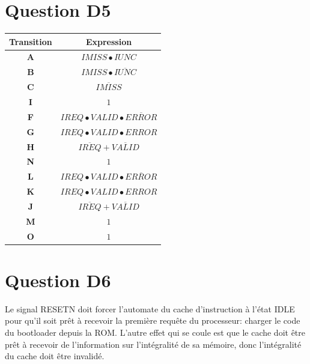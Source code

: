 \documentclass[10pt]{article}
\begin{document}
\section{Question D5}
\begin{center}
  \begin{tabular}{|c|c|}
    \hline
    {\bf Transition} & {\bf Expression} \\ \hline
    {\bf A} & ${IMISS}\bullet{IUNC}$ \\ \hline
    {\bf B} & ${IMISS}\bullet\overline{IUNC}$ \\ \hline
    {\bf C} & $\overline{IMISS}$ \\ \hline
    {\bf I} & $1$ \\ \hline
    {\bf F} & ${IREQ}\bullet{VALID}\bullet\overline{ERROR}$ \\ \hline
    {\bf G} & ${IREQ}\bullet{VALID}\bullet{ERROR}$ \\ \hline
    {\bf H} & $\overline{IREQ}+\overline{VALID}$ \\ \hline
    {\bf N} & $1$ \\ \hline
    {\bf L} & ${IREQ}\bullet{VALID}\bullet\overline{ERROR}$ \\ \hline
    {\bf K} & ${IREQ}\bullet{VALID}\bullet{ERROR}$ \\ \hline
    {\bf J} & $\overline{IREQ}+\overline{VALID}$ \\ \hline
    {\bf M} & $1$ \\ \hline
    {\bf O} & $1$ \\ \hline
  \end{tabular}
\end{center}

\section{Question D6}
Le signal RESETN doit forcer l'automate du cache d'instruction à l'état IDLE
pour qu'il soit prêt à recevoir la première requête du processeur: charger le
code du bootloader depuis la ROM. L'autre effet qui se coule est que le cache
doit être prêt à recevoir de l'information sur l'intégralité de sa mémoire, donc
l'intégralité du cache doit être invalidé.
\end{document}
